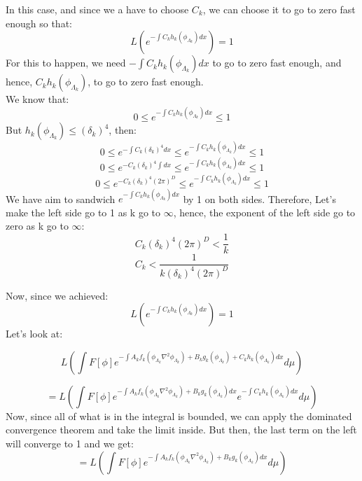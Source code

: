 \documentclass{article}
\theoremstyle{definition}
\begin{document}
In this case, and since we a have to choose $C_k$, we can choose it to go to zero fast enough so that:
\[
L\left(e^{-\int C_k h_k\left(\phi_{\Lambda_k}\right)dx}\right) = 1
\]
For this to happen, we need $-\int C_k h_k\left(\phi_{\Lambda_k}\right)dx$ to go to zero fast enough, and hence, $ C_k h_k\left(\phi_{\Lambda_k}\right)$, to go to zero fast enough.\\
We know that:
\[
0 \leq e^{-\int C_k h_k\left(\phi_{\Lambda_k}\right)dx} \leq 1
\]
But $h_k\left(\phi_{\Lambda_k}\right) \leq (\delta_k)^4$, then:
\[
0 \leq e^{-\int C_k (\delta_k)^4 dx} \leq e^{-\int C_k h_k\left(\phi_{\Lambda_k}\right)dx} \leq 1
\]
\[
0 \leq e^{-C_k (\delta_k)^4\int  dx} \leq e^{-\int C_k h_k\left(\phi_{\Lambda_k}\right)dx} \leq 1
\]
\[
0 \leq e^{-C_k (\delta_k)^4 (2\pi)^D} \leq e^{-\int C_k h_k\left(\phi_{\Lambda_k}\right)dx} \leq 1
\]
We have aim to sandwich $e^{-\int C_k h_k\left(\phi_{\Lambda_k}\right)dx}$ by 1 on both sides. Therefore, Let's make the left side go to 1 as k go to $\infty$, hence, the exponent of the left side go to zero as k go to $\infty$:
\[
C_k (\delta_k)^4 (2\pi)^D < \frac{1}{k}
\]
\[
C_k < \frac{1}{k (\delta_k)^4 (2\pi)^D}
\]

Now, since we achieved:
\[
L\left(e^{-\int C_k h_k\left(\phi_{\Lambda_k}\right)dx}\right) = 1
\]
Let's look at:

\[
L\left(\int F[\phi]e^{-\int A_k f_k\left(\phi_{\Lambda_k} \nabla^2 \phi_{\Lambda_k}\right) + B_k g_k\left(\phi_{\Lambda_k}\right) + C_k h_k\left(\phi_{\Lambda_k}\right)dx}d\mu\right) 
\]

\[
=L\left(\int F[\phi]e^{-\int A_k f_k\left(\phi_{\Lambda_k} \nabla^2 \phi_{\Lambda_k}\right) + B_k g_k\left(\phi_{\Lambda_k}\right)dx} e^{-\int C_k h_k\left(\phi_{\Lambda_k}\right)dx}d\mu\right)
\]
Now, since all of what is in the integral is bounded, we can apply the dominated convergence theorem and take the limit inside. But then, the last term on the left will converge to 1 and we get:
\[
=L\left(\int F[\phi]e^{-\int A_k f_k\left(\phi_{\Lambda_k} \nabla^2 \phi_{\Lambda_k}\right) + B_k g_k\left(\phi_{\Lambda_k}\right)dx} d\mu\right)
\]
\end{document}
